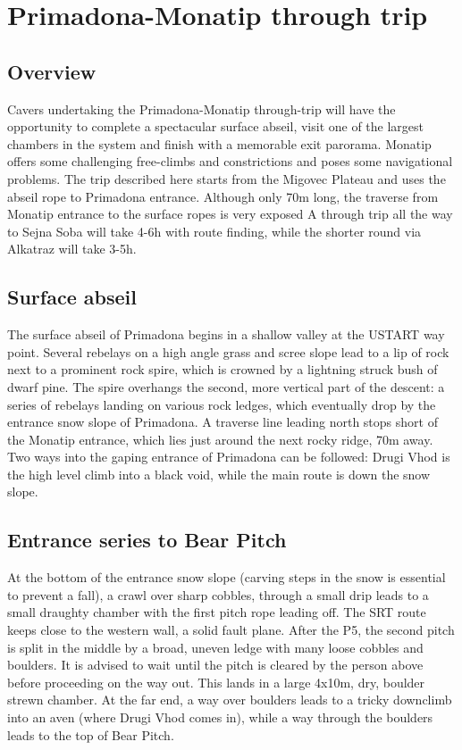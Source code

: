 \section{Primadona-Monatip through trip}

\subsection{Overview}
Cavers undertaking the Primadona-Monatip through-trip will have the opportunity to complete a spectacular surface abseil, visit one of the largest chambers in the system and finish with a memorable exit parorama. Monatip offers some challenging free-climbs and constrictions and poses some navigational problems. The trip described here starts from the Migovec Plateau and uses the abseil rope to Primadona entrance. Although only 70m long, the traverse from Monatip entrance to the surface ropes is very exposed A through trip all the way to Sejna Soba will take 4-6h with route finding, while the shorter round via Alkatraz will take 3-5h. 

\subsection{Surface abseil}
The surface abseil of Primadona begins in a shallow valley at the USTART way point. Several rebelays on a high angle grass and scree slope lead to a lip of rock next to a prominent rock spire, which is crowned by a lightning struck bush of dwarf pine. The spire overhangs the second, more vertical part of the descent: a series of rebelays landing on various rock ledges, which eventually drop by the entrance snow slope of Primadona. A traverse line leading north stops short of the Monatip entrance, which lies just around the next rocky ridge, 70m away. Two ways into the gaping entrance of Primadona can be followed: Drugi Vhod is the high level climb into a black void, while the main route is down the snow slope.

\subsection{Entrance series to Bear Pitch}
At the bottom of the entrance snow slope (carving steps in the snow is essential to prevent a fall), a crawl over sharp cobbles, through a small drip leads to a small draughty chamber with the first pitch rope leading off. The SRT route keeps close to the western wall, a solid fault plane. After the P5, the second pitch is split in the middle by a broad, uneven ledge with many loose cobbles and boulders. It is advised to wait until the pitch is cleared by the person above before proceeding on the way out. This lands in a large 4x10m, dry, boulder strewn chamber. At the far end, a way over boulders leads to a tricky downclimb into an aven (where Drugi Vhod comes in), while a way through the boulders leads to the top of Bear Pitch.

